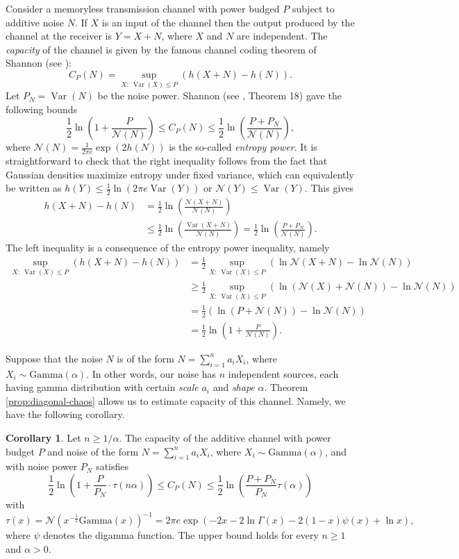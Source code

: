 \documentclass[11pt]{amsart}
\newcommand{\mc}[1]{\mathcal{{#1}}}
\newcommand{\1}{\mathbf{1}}
\DeclareMathOperator{\var}{Var}
\theoremstyle{definition}
\newtheorem{cor}{Corollary}
\theoremstyle{definition}
\theoremstyle{remark}
\begin{document}
Consider a memoryless transmission channel with power budged $P$ subject to additive noise $N$. If $X$ is an input of the channel then the output produced by the channel at the receiver is $Y=X+N$, where $X$ and $N$ are independent. The \emph{capacity} of the channel is given by the famous channel coding theorem of Shannon (see \cite{S48}):
\[
	C_P(N) = \sup_{X: \ \var(X) \leq P} (h(X+N) - h(N)).
\]  
Let $P_N = \var(N)$ be the noise power. Shannon (see \cite{S48}, Theorem 18) gave the following bounds 
\begin{equation}\label{eq:shannon}
	\frac12 \ln\left( 1+\frac{P}{\mc{N}(N)} \right) \leq C_P(N) \leq \frac12 \ln\left( \frac{P+P_N}{\mc{N}(N)} \right),
\end{equation}
where $\mc{N}(N)=\frac{1}{2\pi e} \exp(2h(N))$ is the so-called \emph{entropy power}. It is straightforward to check that the right inequality follows from the fact that Gaussian densities maximize entropy under fixed variance, which can equivalently be written as $h(Y)\leq \frac12 \ln(2\pi e \var(Y))$ or $\mc{N}(Y) \leq \var(Y)$. This gives  
\begin{align*}
h(X+N)-h(N) & = \frac12 \ln\left( \frac{\mc{N}(X+N)}{\mc{N}(N)} \right) \\ & \leq \frac12 \ln\left( \frac{\var(X+N)}{\mc{N}(N)} \right)  =\frac12 \ln\left( \frac{P+P_N}{\mc{N}(N)} \right).
\end{align*}
The left inequality is a consequence of the entropy power inequality, namely
\begin{align*}
	\sup_{X: \ \var(X) \leq P} (h(X+N) - h(N)) & = \frac12 \sup_{X: \ \var(X) \leq P} (\ln \mc{N}(X+N) - \ln \mc{N}(N)) \\ & \geq \frac12 \sup_{X: \ \var(X) \leq P} (\ln (\mc{N}(X)+\mc{N}(N)) - \ln \mc{N}(N)) \\
	& =  \frac12  (\ln (P+\mc{N}(N)) - \ln \mc{N}(N)) \\ & = \frac12 \ln\left( 1+\frac{P}{\mc{N}(N)} \right).
\end{align*}

Suppose that the noise $N$ is of the form $N=\sum_{i=1}^n a_i X_i$, where $X_i \sim \textrm{Gamma}(\alpha)$. In other words, our noise has $n$ independent sources, each having gamma distribution with certain \emph{scale} $a_i$ and \emph{shape} $\alpha$. Theorem \ref{prop:diagonal-chaos} allows us to estimate capacity of this channel. Namely, we have the following corollary.

\begin{cor}\label{cor:capacity}
Let $n \geq 1/\alpha$. The capacity of the additive channel with power budget $P$ and noise of the form $N=\sum_{i=1}^n a_i X_i$, where $X_i \sim \textrm{Gamma}(\alpha)$,  and with noise power $P_N$ satisfies  
\[
	\frac12 \ln \left(1+ \frac{P}{P_N} \cdot \tau(n \alpha) \right) \leq C_P(N) \leq \frac12 \ln \left(\frac{P+P_N}{P_N }\tau(\alpha)  \right)
\]
with 
\[
\tau(x)=\mc{N}(x^{-\frac12}\textrm{Gamma}(x))^{-1} = 2\pi e \exp(-2x-2 \ln \Gamma(x)-2(1-x) \psi(x)+ \ln x), 
\]
where $\psi$ denotes the digamma function. The upper bound  holds for every $n \geq 1$ and $\alpha>0$.
\end{cor} 
\end{document}
